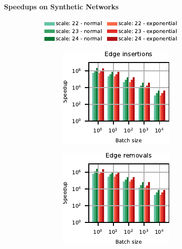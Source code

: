 \paragraph{Speedups on Synthetic Networks}
%
\begin{figure}[t]
\centering

\begin{subfigure}[t]{\textwidth}
\centering
\includegraphics{sources/plots/dyn-mwm/legend-synthetic.pdf}
\end{subfigure}\smallskip

\begin{subfigure}[b]{.5\textwidth}
\begin{subfigure}[b]{.5\textwidth}
\centering
\includegraphics[width=.9\textwidth]{sources/plots/dyn-mwm/speedup-rmat-insertion.pdf}
\end{subfigure}\hfill
\begin{subfigure}[b]{.5\textwidth}
\centering
\includegraphics[width=.9\textwidth]{sources/plots/dyn-mwm/speedup-rmat-removal.pdf}

\end{subfigure}
\end{subfigure}
\end{figure}
